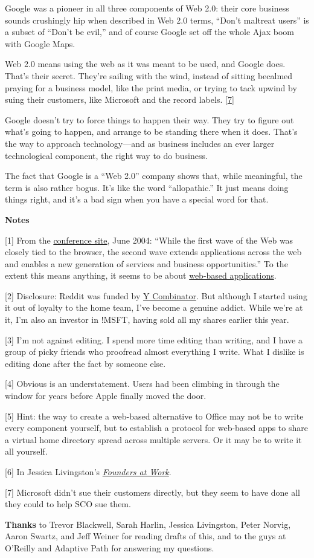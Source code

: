 Google was a pioneer in all three components of Web 2.0: their core
business sounds crushingly hip when described in Web 2.0 terms, ``Don't
maltreat users'' is a subset of ``Don't be evil,'' and of course Google
set off the whole Ajax boom with Google Maps.

Web 2.0 means using the web as it was meant to be used, and Google does.
That's their secret. They're sailing with the wind, instead of sitting
becalmed praying for a business model, like the print media, or trying
to tack upwind by suing their customers, like Microsoft and the record
labels. {[}\hyperref[f7n]{7}{]}

Google doesn't try to force things to happen their way. They try to
figure out what's going to happen, and arrange to be standing there when
it does. That's the way to approach technology---and as business
includes an ever larger technological component, the right way to do
business.

The fact that Google is a ``Web 2.0'' company shows that, while
meaningful, the term is also rather bogus. It's like the word
``allopathic.'' It just means doing things right, and it's a bad sign
when you have a special word for that.

\textbf{Notes}

{[}1{]} From the
\href{http://web.archive.org/web/20040602111547/http://web2con.com/}{conference
site}, June 2004: ``While the first wave of the Web was closely tied to
the browser, the second wave extends applications across the web and
enables a new generation of services and business opportunities.'' To
the extent this means anything, it seems to be about
\href{road.html}{web-based applications}.

{[}2{]} Disclosure: Reddit was funded by \href{http://ycombinator.com}{Y
Combinator}. But although I started using it out of loyalty to the home
team, I've become a genuine addict. While we're at it, I'm also an
investor in !MSFT, having sold all my shares earlier this year.

{[}3{]} I'm not against editing. I spend more time editing than writing,
and I have a group of picky friends who proofread almost everything I
write. What I dislike is editing done after the fact by someone else.

{[}4{]} Obvious is an understatement. Users had been climbing in through
the window for years before Apple finally moved the door.

{[}5{]} Hint: the way to create a web-based alternative to Office may
not be to write every component yourself, but to establish a protocol
for web-based apps to share a virtual home directory spread across
multiple servers. Or it may be to write it all yourself.

{[}6{]} In Jessica Livingston's
\href{http://foundersatwork.com}{\emph{Founders at Work}}.

{[}7{]} Microsoft didn't sue their customers directly, but they seem to
have done all they could to help SCO sue them.

\textbf{Thanks} to Trevor Blackwell, Sarah Harlin, Jessica Livingston,
Peter Norvig, Aaron Swartz, and Jeff Weiner for reading drafts of this,
and to the guys at O'Reilly and Adaptive Path for answering my
questions.
